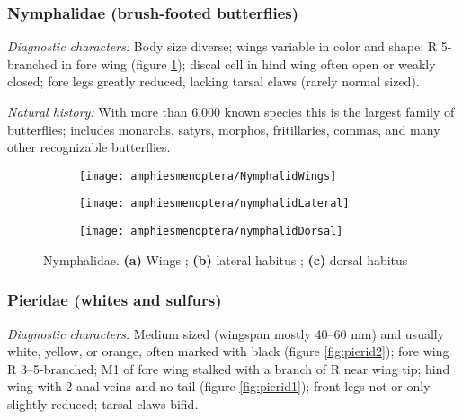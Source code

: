 \subsubsection{Nymphalidae (brush-footed butterflies)}
\noindent{}\textit{Diagnostic characters:} Body size diverse; wings variable in color and shape; R 5-branched in fore wing (figure \ref{fig:nymphalid1}); discal cell in hind wing often open or weakly closed; fore legs greatly reduced, lacking tarsal claws (rarely normal sized).\vspace{3mm}

\noindent{}\textit{Natural history:} With more than 6,000 known species this is the largest family of butterflies; includes monarchs, satyrs, morphos, fritillaries, commas, and many other recognizable butterflies.

\begin{figure}[ht!]
    \centering
    \begin{subfigure}[ht!]{0.25\textwidth}
        \texttt{[image: amphiesmenoptera/NymphalidWings]}
        \caption{}
        \label{fig:nymphalid1}
    \end{subfigure}
    \hfill
    \begin{subfigure}[ht!]{0.30\textwidth}
        \texttt{[image: amphiesmenoptera/nymphalidLateral]}
        \caption{}
        \label{fig:nymphalid2}
    \end{subfigure}
        \hfill
    \begin{subfigure}[ht!]{0.38\textwidth}
        \texttt{[image: amphiesmenoptera/nymphalidDorsal]}
        \caption{}
        \label{fig:nymphalid3}
    \end{subfigure}
    \caption{Nymphalidae. \textbf{(a)} Wings \citep[][Fig. 78]{bhl162310}; \textbf{(b)} lateral habitus \citep[Modified from Limenitis II in][]{bhlitem37427butt}; \textbf{(c)} dorsal habitus \citep[Modified from Limenitis II in][]{bhlitem37427butt}}\label{fig:nymphalids}
\end{figure}

\subsubsection{Pieridae (whites and sulfurs)}
\noindent{}\textit{Diagnostic characters:} Medium sized (wingspan mostly 40--60 mm) and usually white, yellow, or orange, often marked with black (figure \ref{fig:pierid2}); fore wing R 3--5-branched; M1 of fore wing stalked with a branch of R near wing tip; hind wing with 2 anal veins and no tail (figure \ref{fig:pierid1}); front legs not or only slightly reduced; tarsal claws bifid.\vspace{3mm}

